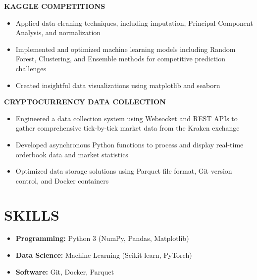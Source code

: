 \documentclass[10pt,letterpaper]{article}
\begin{document}
\begin{flushleft}
\textbf{\color{subheadingcolor}KAGGLE COMPETITIONS}
\begin{itemize}[leftmargin=*,nosep,itemsep=2pt]
    \item Applied data cleaning techniques, including imputation, Principal Component Analysis, and normalization
    \item Implemented and optimized machine learning models including Random Forest, Clustering, and Ensemble methods for competitive prediction challenges
    \item Created insightful data visualizations using matplotlib and seaborn
\end{itemize}
\end{flushleft}

\begin{flushleft}
\textbf{\color{subheadingcolor}CRYPTOCURRENCY DATA COLLECTION}
\begin{itemize}[leftmargin=*,nosep,itemsep=2pt]
    \item Engineered a data collection system using Websocket and REST APIs to gather comprehensive tick-by-tick market data from the Kraken exchange
    \item Developed asynchronous Python functions to process and display real-time orderbook data and market statistics
    \item Optimized data storage solutions using Parquet file format, Git version control, and Docker containers
\end{itemize}
\end{flushleft}

\vspace{0.5em}
\section{SKILLS}
\vspace{0.5em}
\begin{minipage}[t]{0.48\textwidth}
\begin{itemize}[leftmargin=*,nosep,itemsep=2pt]
  \item \textbf{Programming:} Python 3 (NumPy, Pandas, Matplotlib)
  \item \textbf{Data Science:} Machine Learning (Scikit-learn, PyTorch)
\end{itemize}
\end{minipage}
\hfill
\begin{minipage}[t]{0.48\textwidth}
\begin{itemize}[leftmargin=*,nosep,itemsep=2pt]
  \item \textbf{Software:} Git, Docker, Parquet  
\end{itemize}
\end{minipage}
\end{document}
